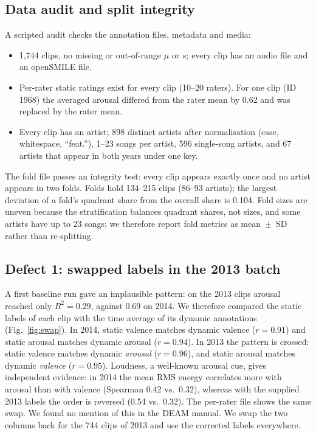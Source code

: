 \documentclass[conference]{IEEEtran}
\newcommand{\R}{R^2}
\begin{document}
\subsection{Data audit and split integrity}
\label{sec:res-audit}
A scripted audit checks the annotation files, metadata and media:
\begin{itemize}
\item 1{,}744 clips, no missing or out-of-range $\mu$ or $s$; every clip has
an audio file and an openSMILE file.
\item Per-rater static ratings exist for every clip (10--20 raters). For one
clip (ID 1968) the averaged arousal differed from the rater mean by 0.62 and
was replaced by the rater mean.
\item Every clip has an artist; 898 distinct artists after normalisation
(case, whitespace, ``feat.''), 1--23 songs per artist, 596 single-song
artists, and 67 artists that appear in both years under one key.
\end{itemize}

The fold file passes an integrity test: every clip appears exactly once and
no artist appears in two folds. Folds hold 134--215 clips (86--93 artists);
the largest deviation of a fold's quadrant share from the overall share is
0.104. Fold sizes are uneven because the stratification balances quadrant
shares, not sizes, and some artists have up to 23 songs; we therefore report
fold metrics as mean~$\pm$~SD rather than re-splitting.

\subsection{Defect 1: swapped labels in the 2013 batch}
\label{sec:res-swap}
A first baseline run gave an implausible pattern: on the 2013 clips arousal
reached only $\R=0.29$, against $0.69$ on 2014. We therefore compared the
static labels of each clip with the time average of its dynamic annotations
(Fig.~\ref{fig:swap}). In 2014, static valence matches dynamic valence
($r=0.91$) and static arousal matches dynamic arousal ($r=0.94$). In 2013 the
pattern is crossed: static valence matches dynamic \emph{arousal} ($r=0.96$),
and static arousal matches dynamic \emph{valence} ($r=0.95$). Loudness, a
well-known arousal cue, gives independent evidence: in 2014 the mean RMS
energy correlates more with arousal than with valence (Spearman 0.42 vs.\
0.32), whereas with the supplied 2013 labels the order is reversed (0.54 vs.\
0.32). The per-rater file shows the same swap. We found no mention of this in
the DEAM manual. We swap the two columns back for the 744 clips of 2013 and
use the corrected labels everywhere.
\end{document}
